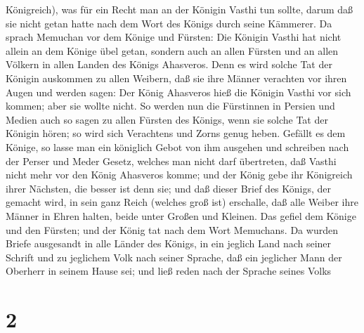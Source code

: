 Königreich),  was für ein Recht man an der Königin Vasthi
tun sollte, darum daß sie nicht getan hatte nach dem Wort des Königs
durch seine Kämmerer.  Da sprach Memuchan vor dem Könige
und Fürsten: Die Königin Vasthi hat nicht allein an dem Könige übel
getan, sondern auch an allen Fürsten und an allen Völkern in allen
Landen des Königs Ahasveros.  Denn es wird solche Tat der
Königin auskommen zu allen Weibern, daß sie ihre Männer verachten vor
ihren Augen und werden sagen: Der König Ahasveros hieß die Königin
Vasthi vor sich kommen; aber sie wollte nicht.  So werden
nun die Fürstinnen in Persien und Medien auch so sagen zu allen Fürsten
des Königs, wenn sie solche Tat der Königin hören; so wird sich
Verachtens und Zorns genug heben.  Gefällt es dem Könige,
so lasse man ein königlich Gebot von ihm ausgehen und schreiben nach der
Perser und Meder Gesetz, welches man nicht darf übertreten, daß Vasthi
nicht mehr vor den König Ahasveros komme; und der König gebe ihr
Königreich ihrer Nächsten, die besser ist denn sie;  und
daß dieser Brief des Königs, der gemacht wird, in sein ganz Reich
(welches groß ist) erschalle, daß alle Weiber ihre Männer in Ehren
halten, beide unter Großen und Kleinen.  Das gefiel dem
Könige und den Fürsten; und der König tat nach dem Wort Memuchans.
 Da wurden Briefe ausgesandt in alle Länder des Königs, in
ein jeglich Land nach seiner Schrift und zu jeglichem Volk nach seiner
Sprache, daß ein jeglicher Mann der Oberherr in seinem Hause sei; und
ließ reden nach der Sprache seines Volks

\hypertarget{section-1}{%
\section{2}\label{section-1}}

